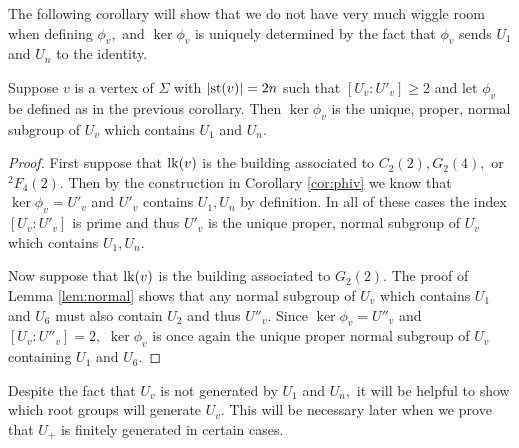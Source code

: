 \documentclass[class=book, crop=false,12 pt]{standalone}
\begin{document}
The following corollary will show that we do not have very much wiggle room when defining $\phi_v,$ and $\ker \phi_v$ is uniquely determined by the fact that $\phi_v$ sends $U_1$ and $U_n$ to the identity.
\begin{cor}
	\label{cor:uniquephiv}
	Suppose $v$ is a vertex of $\Sigma$ with $|\mathrm{st}(v)|=2n$ such that $[U_v:U'_v]\ge 2$ and let $\phi_v$ be defined as in the previous corollary. Then $\ker \phi_v$ is the unique, proper, normal subgroup of $U_v$ which contains $U_1$ and $U_n.$
\end{cor}
\begin{proof}
	First suppose that $\mathrm{lk}(v)$ is the building associated to $C_2(2),G_2(4),$ or ${}^2F_4(2).$ Then by the construction in Corollary \ref{cor:phiv} we know that $\ker \phi_v=U'_v$ and $U'_v$ contains $U_1,U_n$ by definition. In all of these cases the index $[U_v:U'_v]$ is prime and thus $U'_v$ is the unique proper, normal subgroup of $U_v$ which contains $U_1,U_n.$

	Now suppose that $\mathrm{lk}(v)$ is the building associated to $G_2(2).$ The proof of Lemma \ref{lem:normal} shows that any normal subgroup of $U_v$ which contains $U_1$ and $U_6$ must also contain $U_2$ and thus $U''_v.$ Since $\ker \phi_v=U''_v$ and $[U_v:U''_v]=2,$ $\ker\phi_v$ is once again the unique proper normal subgroup of $U_v$ containing $U_1$ and $U_6.$
\end{proof}

Despite the fact that $U_v$ is not generated by $U_1$ and $U_n,$ it will be helpful to show which root groups will generate $U_v.$ This will be necessary later when we prove that $U_+$ is finitely generated in certain cases.
\end{document}
